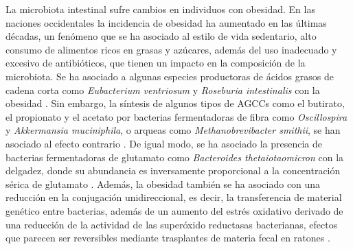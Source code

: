 \documentclass[
]{book}
\begin{document}
La microbiota intestinal sufre cambios en individuos con obesidad. En las naciones occidentales la incidencia de obesidad ha aumentado en las últimas décadas, un fenómeno que se ha asociado al estilo de vida sedentario, alto consumo de alimentos ricos en grasas y azúcares, además del uso inadecuado y excesivo de antibióticos, que tienen un impacto en la composición de la microbiota. Se ha asociado a algunas especies productoras de ácidos grasos de cadena corta como \emph{Eubacterium ventriosum} y \emph{Roseburia intestinalis} con la obesidad \citep{tims2013microbiota}. Sin embargo, la síntesis de algunos tipos de AGCCs como el butirato, el propionato y el acetato por bacterias fermentadoras de fibra como \emph{Oscillospira} y \emph{Akkermansia muciniphila}, o arqueas como \emph{Methanobrevibacter smithii}, se han asociado al efecto contrario \citep{gophna2017oscillospira}. De igual modo, se ha asociado la presencia de bacterias fermentadoras de glutamato como \emph{Bacteroides thetaiotaomicron} con la delgadez, donde su abundancia es inversamente proporcional a la concentración sérica de glutamato \citep{miller1982isolation}. Además, la obesidad también se ha asociado con una reducción en la conjugación unidireccional, es decir, la transferencia de material genético entre bacterias, además de un aumento del estrés oxidativo derivado de una reducción de la actividad de las superóxido reductasas bacterianas, efectos que parecen ser reversibles mediante trasplantes de materia fecal en ratones \citep{ridaura2013gut}.
\end{document}
